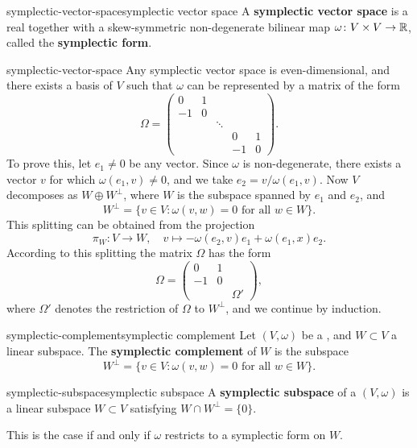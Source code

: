 \begin{topic}{symplectic-vector-space}{symplectic vector space}
    A \textbf{symplectic vector space} is a real  together with a skew-symmetric non-degenerate bilinear map $\omega \colon V \times V \to \mathbb{R}$, called the \textbf{symplectic form}.
\end{topic}

\begin{example}{symplectic-vector-space}
    Any symplectic vector space is even-dimensional, and there exists a basis of $V$ such that $\omega$ can be represented by a matrix of the form
    \[ \Omega = \begin{pmatrix} 0 & 1 & & & \\ -1 & 0 & & & \\ & & \ddots & & \\ & & & 0 & 1 \\ & & & -1 & 0 \end{pmatrix} . \]
    To prove this, let $e_1 \ne 0$ be any vector. Since $\omega$ is non-degenerate, there exists a vector $v$ for which $\omega(e_1, v) \ne 0$, and we take $e_2 = v/\omega(e_1, v)$. Now $V$ decomposes as $W \oplus W^\perp$, where $W$ is the subspace spanned by $e_1$ and $e_2$, and
    \[ W^\perp = \{ v \in V : \omega(v, w) = 0 \text{ for all } w \in W \} . \]
    This splitting can be obtained from the projection
    \[ \pi_W \colon V \to W, \quad v \mapsto - \omega(e_2, v) e_1 + \omega(e_1, x) e_2 . \]
    According to this splitting the matrix $\Omega$ has the form
    \[ \Omega = \begin{pmatrix} 0 & 1 & \\ -1 & 0 & \\ & & \Omega' \end{pmatrix} , \]
    where $\Omega'$ denotes the restriction of $\Omega$ to $W^\perp$, and we continue by induction.
\end{example}

\begin{topic}{symplectic-complement}{symplectic complement}
    Let $(V, \omega)$ be a , and $W \subset V$ a linear subspace. The \textbf{symplectic complement} of $W$ is the subspace
    \[ W^\perp = \{ v \in V : \omega(v, w) = 0 \text{ for all } w \in W \} . \]
\end{topic}

\begin{topic}{symplectic-subspace}{symplectic subspace}
    A \textbf{symplectic subspace} of a  $(V, \omega)$ is a linear subspace $W \subset V$ satisfying $W \cap W^\perp = \{ 0 \}$.
    
    This is the case if and only if $\omega$ restricts to a symplectic form on $W$.
\end{topic}

